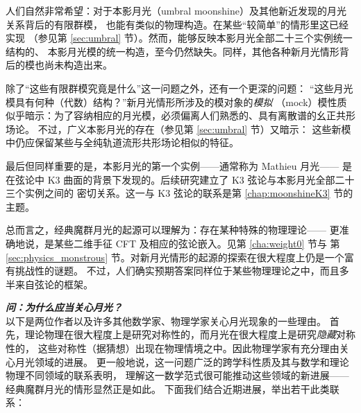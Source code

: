 \documentclass[11pt,a4paper,fontset=windows]{ctexart}
\numberwithin{equation}{section}
\begin{document}
人们自然非常希望：对于本影月光（umbral moonshine）及其他新近发现的月光关系背后的有限群模，
也能有类似的物理构造。在某些“较简单”的情形里这已经实现
（参见第 \ref{sec:umbral} 节）。然而，能够反映本影月光全部二十三个实例统一结构的、
本影月光模的统一构造，至今仍然缺失。同样，其他各种新月光情形背后的模也尚未构造出来。


除了“这些有限群模究竟是什么”这一问题之外，还有一个更深的问题：
“这些月光模具有何种（代数）结构？”新月光情形所涉及的模对象的\emph{模拟}
（mock）模性质似乎暗示：为了容纳相应的月光模，必须偏离人们熟悉的、具有离散谱的幺正共形场论。
不过，广义本影月光的存在（参见第 \ref{sec:umbral} 节）又暗示：
这些新模中仍应保留某些与全纯轨道流形共形场论相似的特征。


最后但同样重要的是，本影月光的第一个实例——通常称为 Mathieu 月光——
是在弦论中 K3 曲面的背景下发现的。后续研究建立了 K3 弦论与本影月光全部二十三个实例之间的
密切关系。这一与 K3 弦论的联系是第 \ref{chap:moonshineK3} 节的主题。


总而言之，经典魔群月光的起源可以理解为：存在某种特殊的物理理论——
更准确地说，是某些二维手征 CFT 及相应的弦论嵌入。见第 \ref{cha:weight0} 节与
第 \ref{sec:physics_monstrous} 节。对新月光情形的起源的探索在很大程度上仍是一个富有挑战性的谜题。
不过，人们确实预期答案同样位于某些物理理论之中，而且多半来自弦论的框架。

\vspace{10pt}
\noindent
{\bf \em 问：为什么应当关心月光？}\\\noindent
以下是两位作者以及许多其他数学家、物理学家关心月光现象的一些理由。
首先，理论物理在很大程度上是研究对称性的，而月光在很大程度上是研究\emph{隐藏}对称性的，
这些对称性（据猜想）出现在物理情境之中。因此物理学家有充分理由关心月光领域的进展。
更一般地说，这一问题广泛的跨学科性质及其与数学和理论物理不同领域的联系表明，
理解这一数学范式很可能推动这些领域的新进展——经典魔群月光的情形显然正是如此。
下面我们结合近期进展，举出若干此类联系：
\end{document}
